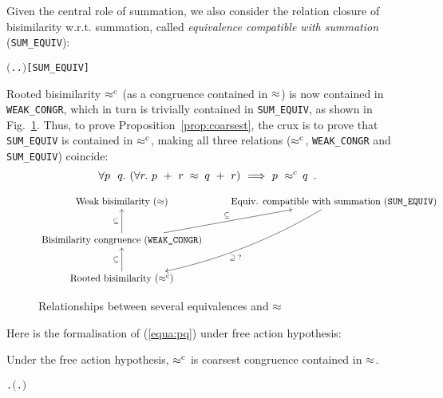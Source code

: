 Given the central role of
 summation, we also consider the relation closure of bisimilarity
 w.r.t. summation, called \emph{equivalence compatible with summation}
(\texttt{SUM_EQUIV}): %
\begin{alltt}
    \HOLTokenDefEquality{} \ensuremath{(}\HOLTokenLambda{} . \HOLSymConst{\HOLTokenForall{}}.  \HOLSymConst{\ensuremath{+}}  \HOLSymConst{\HOLTokenWeakEQ}  \HOLSymConst{\ensuremath{+}} \ensuremath{)}\hfill{[SUM_EQUIV]}
\end{alltt}

Rooted bisimilarity $\mathrel{\approx^{\rm{c}}}$ (as a congruence contained in
$\approx$) is now contained in \texttt{WEAK_CONGR},
which in turn is trivially contained in \texttt{SUM_EQUIV}, as shown
in Fig.~\ref{fig:relationship}. Thus, to prove Proposition~\ref{prop:coarsest},
the crux is to prove that \texttt{SUM_EQUIV} is contained in
$\mathrel{\approx^{\rm{c}}}$,
making all three relations
($\mathrel{\approx^{\rm{c}}}$, \texttt{WEAK_CONGR} and \texttt{SUM_EQUIV}) coincide:
\begin{equation}
\label{equa:pq}
\forall p\ \ q.\ ( \forall r.\ p\ +\ r \;\approx\; q\ +\ r ) \
\Longrightarrow\ p\ \mathrel{\approx^{\rm{c}}}\ \! q\enspace.
\end{equation}

\begin{figure}[ht]
\begin{displaymath}
\xymatrix{
{\textrm{Weak bisimilarity } (\approx)} & {\textrm{Equiv.
    compatible with summation (\texttt{SUM\_EQUIV})}}
\ar@/^3ex/[ldd]^{\supseteq\; ?}\\
{\textrm{Bisimilarity congruence (\texttt{WEAK\_CONGR})}}
\ar[u]^{\subseteq} \ar[ru]^{\subseteq} \\
{\textrm{Rooted bisimilarity } (\rapprox)} \ar[u]^{\subseteq}
}
\end{displaymath}
\caption{Relationships between several equivalences and $\approx$}
\label{fig:relationship}
\end{figure}

Here is the formalisation of (\ref{equa:pq}) under free action hypothesis:
\begin{theorem}
  \label{thm:coarsestR}
  Under the free action hypothesis, $\mathrel{\approx^{\rm{c}}}$ is coarsest congruence contained in $\approx$.
\begin{alltt}
\HOLTokenTurnstile{} \HOLSymConst{\HOLTokenForall{}} .   \HOLSymConst{\HOLTokenConj{}}   \HOLSymConst{\HOLTokenImp{}} \ensuremath{(}\HOLSymConst{\HOLTokenForall{}}.  \HOLSymConst{\ensuremath{+}}  \HOLSymConst{\HOLTokenWeakEQ}  \HOLSymConst{\ensuremath{+}} \ensuremath{)} \HOLSymConst{\HOLTokenImp{}}  \HOLSymConst{\HOLTokenObsCongr} 
\end{alltt}
\end{theorem}

